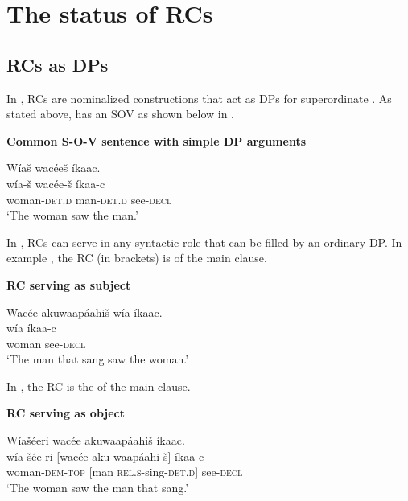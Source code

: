 \documentclass[output=paper]{LSP/langsci}
\begin{document}
\section{The status of  RCs}\label{sec:boyle:2}

\subsection{ RCs as DPs}\label{sec:boyle:2.1}

In , RCs are nominalized constructions that act as DPs for superordinate . As stated above,  has an SOV  as shown below in .

\ea \textbf{Common S-O-V sentence with simple DP arguments} \label{boyle1}

\glll W\'ia\v{s} wac\'ee\v{s} \'ikaac.\\
w\'ia-\v{s}  wac\'ee-\v{s} \'ikaa-c\\
woman-\textsc{det.d} man-\textsc{det.d} see-\textsc{decl}\\
\trans`The woman saw the man.' 
\z

In , RCs can serve in any syntactic role that can be filled by an ordinary DP. In example , the RC (in brackets) is  of the main clause.  

\ea \textbf{RC serving as subject} \label{boyle2}

\glll {\ob}Wac\'ee akuwaap\'aahi\v{s}{\cb}  w\'ia \'ikaac.\\	
[wac\'ee aku-waap\'aahi-\v{s}] w\'ia  \'ikaa-c\\
[man \textsc{rel.s}-sing-\textsc{det.d}] woman see-\textsc{decl}\\
\trans`The man that sang saw the woman.' 
\z

In , the RC is the  of the main clause.

\ea \textbf{RC serving as object} \label{boyle3}

\glll W\'ia\v{s}\'eeri  {\ob}wac\'ee akuwaap\'aahi\v{s}{\cb}  \'ikaac.\\
w\'ia-\v{s}\'ee-ri  [wac\'ee aku-waap\'aahi-\v{s}] \'ikaa-c\\
woman-\textsc{dem-top} [man \textsc{rel.s}-sing-\textsc{det.d}] see-\textsc{decl}\\
\trans `The woman saw the man that sang.' 
\z
\end{document}
